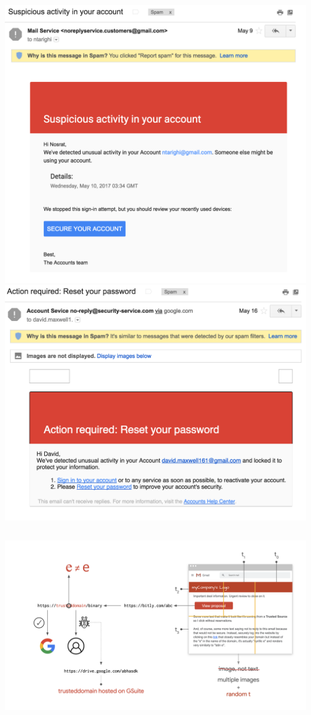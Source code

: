 \documentclass[nobackground,dvipsnames,table]{beamer}
\begin{document}
\begin{frame}{}
\begin{columns}
            \includegraphics[width=\textwidth]{susmail2}
            \includegraphics[width=\textwidth]{susmail4}
    \end{columns}
\end{frame}

\begin{frame}{}%
    \thispagestyle{empty}
    \includegraphics[width=\paperwidth]{anatomy-of-phishing-mail}
\end{frame}
\end{document}
